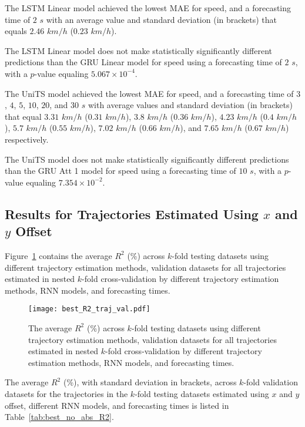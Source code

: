 The LSTM Linear model achieved the lowest MAE for speed, and a forecasting time of $2$ $s$ with an average value and standard deviation (in brackets) that equals $2.46$ $km/h$ ($0.23$ $km/h$).

The LSTM Linear model does not make statistically significantly different predictions than the GRU Linear model for speed using a forecasting time of $2$ $s$, with a $p$-value equaling $5.067 \times 10^{-4}$.

The UniTS model achieved the lowest MAE for speed, and a forecasting time of $3$, $4$, $5$, $10$, $20$, and $30$ $s$ with average values and standard deviation (in brackets) that equal $3.31$ $km/h$ ($0.31$ $km/h$), $3.8$ $km/h$ ($0.36$ $km/h$), $4.23$ $km/h$ ($0.4$ $km/h$), $5.7$ $km/h$ ($0.55$ $km/h$), $7.02$ $km/h$ ($0.66$ $km/h$), and $7.65$ $km/h$ ($0.67$ $km/h$) respectively.

The UniTS model does not make statistically significantly different predictions than the GRU Att 1 model for speed using a forecasting time of $10$ $s$, with a $p$-value equaling $7.354 \times 10^{-2}$.

\subsection{Results for Trajectories Estimated Using $x$ and $y$ Offset}

Figure~\ref{fig:best_R2_traj_val} contains the average $R^{2}$ (\%) across $k$-fold testing datasets using different trajectory estimation methods, validation datasets for all trajectories estimated in nested $k$-fold cross-validation by different trajectory estimation methods, RNN models, and forecasting times.

\begin{figure}[!ht]
	\centering
	\texttt{[image: best\_R2\_traj\_val.pdf]}
	\caption{The average $R^{2}$ (\%) across $k$-fold testing datasets using different trajectory estimation methods, validation datasets for all trajectories estimated in nested $k$-fold cross-validation by different trajectory estimation methods, RNN models, and forecasting times.}
	\label{fig:best_R2_traj_val}
\end{figure}

The average $R^{2}$ (\%), with standard deviation in brackets, across $k$-fold validation datasets for the trajectories in the $k$-fold testing datasets estimated using $x$ and $y$ offset, different RNN models, and forecasting times is listed in Table~\ref{tab:best_no_abs_R2}.

